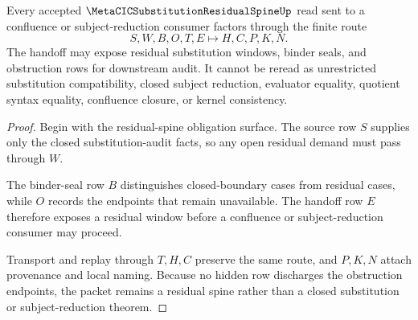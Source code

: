 \begin{theorem}
\label{thm:metacic-substitution-residual-spine-window-handoff}
Every accepted $\MetaCICSubstitutionResidualSpineUp$ read sent to a confluence or subject-reduction consumer factors through the finite route
$$
S,W,B,O,T,E \longmapsto H,C,P,K,N .
$$
The handoff may expose residual substitution windows, binder seals, and obstruction rows for downstream audit. It cannot be reread as unrestricted substitution compatibility, closed subject reduction, evaluator equality, quotient syntax equality, confluence closure, or kernel consistency.
\end{theorem}
\begin{proof}
Begin with the residual-spine obligation surface. The source row $S$ supplies only the closed substitution-audit facts, so any open residual demand must pass through $W$.

The binder-seal row $B$ distinguishes closed-boundary cases from residual cases, while $O$ records the endpoints that remain unavailable. The handoff row $E$ therefore exposes a residual window before a confluence or subject-reduction consumer may proceed.

Transport and replay through $T,H,C$ preserve the same route, and $P,K,N$ attach provenance and local naming. Because no hidden row discharges the obstruction endpoints, the packet remains a residual spine rather than a closed substitution or subject-reduction theorem.
\end{proof}




